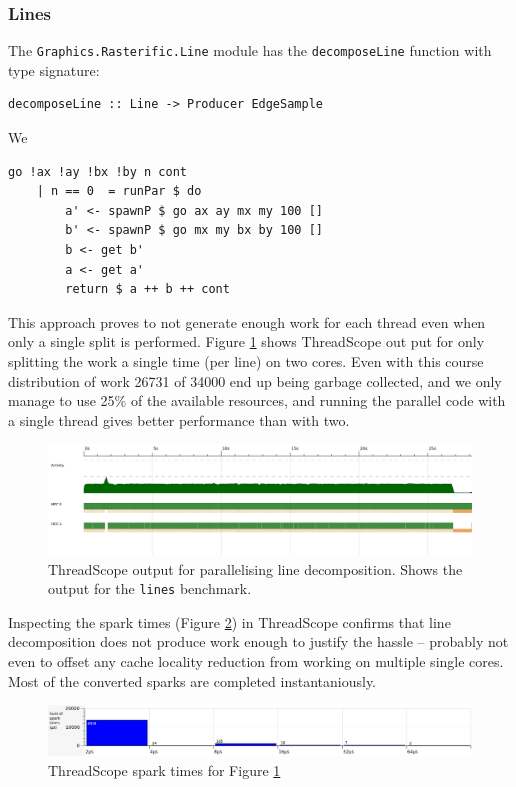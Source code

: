 \documentclass[12pt, a4paper]{article}
\begin{document}
\subsubsection{Lines}
The \texttt{Graphics.Rasterific.Line} module has the \texttt{decomposeLine} function with type
signature:
\begin{lstlisting}
decomposeLine :: Line -> Producer EdgeSample\end{lstlisting}
We %
\begin{lstlisting}[caption={Naively splitting work in two parts}]
    go !ax !ay !bx !by n cont
    | n == 0  = runPar $ do
        a' <- spawnP $ go ax ay mx my 100 []
        b' <- spawnP $ go mx my bx by 100 []
        b <- get b'
        a <- get a'
        return $ a ++ b ++ cont
\end{lstlisting}
This approach proves to not generate enough work for each thread even when only a single split
is performed. Figure \ref{fig:line-thread} shows ThreadScope out put for only splitting the
work a single time (per line) on two cores. Even with this course distribution of work
26731 of 34000 end up being garbage collected, and we only manage to use 25\% of the available
resources, and running the parallel code with a single thread gives better performance than with
two.
\begin{figure}[h!]
  \centering
  \includegraphics[width=0.85\linewidth]{../threadscope/lines/single-split}
  \caption{ThreadScope output for parallelising line decomposition. Shows the output for the
    \texttt{lines} benchmark.}
  \label{fig:line-thread}
\end{figure}

Inspecting the spark times (Figure \ref{fig:line-thread-sparks}) in ThreadScope confirms that line
decomposition does not produce work enough to justify the hassle --
probably not even to offset any cache locality reduction from working 
on multiple single cores. Most of the converted sparks are completed instantaniously.

\begin{figure}[h!]
  \centering
  \includegraphics[width=0.85\linewidth]{../threadscope/lines/single-split-spark-times}
  \caption{ThreadScope spark times for Figure \ref{fig:line-thread}}
  \label{fig:line-thread-sparks}
\end{figure}
\end{document}
